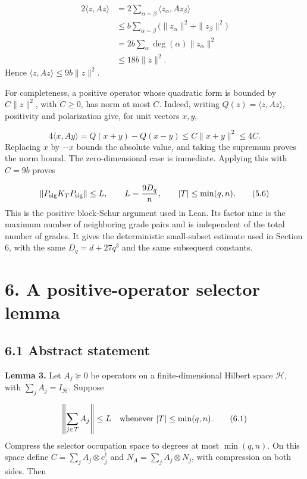 \documentclass[11pt,a4paper]{article}
\begin{document}
\begin{equation}
\begin{aligned}
2\langle z,Az\rangle
&=2\sum_{\alpha\sim\beta}\langle z_\alpha,A z_\beta\rangle\\
&\le b\sum_{\alpha\sim\beta}
 \bigl(\|z_\alpha\|^2+\|z_\beta\|^2\bigr)\\
&=2b\sum_\alpha\deg(\alpha)\|z_\alpha\|^2\\
&\le18b\|z\|^2.
\end{aligned}
\tag{5.5}
\end{equation}
Hence \(\langle z,Az\rangle\le9b\|z\|^2\).

For completeness, a positive operator whose quadratic form is bounded by \(C\|z\|^2\), with \(C\ge0\), has norm at most \(C\). Indeed, writing \(Q(z)=\langle z,Az\rangle\), positivity and polarization give, for unit vectors \(x,y\),

\begin{equation*}
4\langle x,Ay\rangle=Q(x+y)-Q(x-y)
\le C\|x+y\|^2\le4C.
\end{equation*}
Replacing \(x\) by \(-x\) bounds the absolute value, and taking the supremum proves the norm bound. The zero-dimensional case is immediate. Applying this with \(C=9b\) proves

\begin{equation}
\left\|P_{\rm sig}K_TP_{\rm sig}\right\|
\le L,\qquad L=\frac{9D_q}{n},
\qquad |T|\le\min(q,n).
\tag{5.6}
\end{equation}
This is the positive block-Schur argument used in Lean. Its factor nine is the maximum number of neighboring grade pairs and is independent of the total number of grades. It gives the deterministic small-subset estimate used in Section 6, with the same \(D_q=d+27q^3\) and the same subsequent constants.

\section*{6. A positive-operator selector lemma}
\subsection*{6.1 Abstract statement}
\textbf{Lemma 3.} Let \(A_j\succeq0\) be operators on a finite-dimensional Hilbert space \(\mathcal H\), with \(\sum_jA_j=I_{\mathcal H}\). Suppose

\begin{equation}
\left\|\sum_{j\in T}A_j\right\|\le L
\quad\hbox{whenever } |T|\le\min(q,n).
\tag{6.1}
\end{equation}
Compress the selector occupation space to degrees at most \(\min(q,n)\). On this space define \(C=\sum_j A_j\otimes c_j^\dagger\) and \(N_A=\sum_j A_j\otimes N_j\), with compression on both sides. Then
\end{document}
